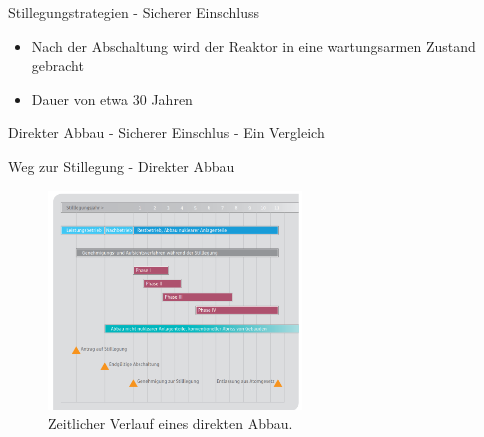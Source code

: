\begin{frame}{Stillegungstrategien - Sicherer Einschluss}
  \begin{itemize}
    \setlength\itemsep{1.2em}
    \item{ Nach der Abschaltung wird der Reaktor in eine wartungsarmen Zustand gebracht}
    \item{ Dauer von etwa $30$ Jahren}
  \end{itemize}
\end{frame}



\begin{frame}{ Direkter Abbau - Sicherer Einschlus - Ein Vergleich}

\end{frame}


\begin{frame}{ Weg zur Stillegung - Direkter Abbau }
  \begin{figure}
     \centering
     \includegraphics[width=0.6\textwidth]{./bilder/stillegungs_zeit_2_kernfragen.PNG}
     \caption{ Zeitlicher Verlauf eines direkten Abbau\cite{ stilllegung_grs }. }
     \label{ fig: stillegung }
   \end{figure}
\end{frame}




\begin{frame}[allowframebreaks]
  \nocite{*}
  \printbibliography
\end{frame}


